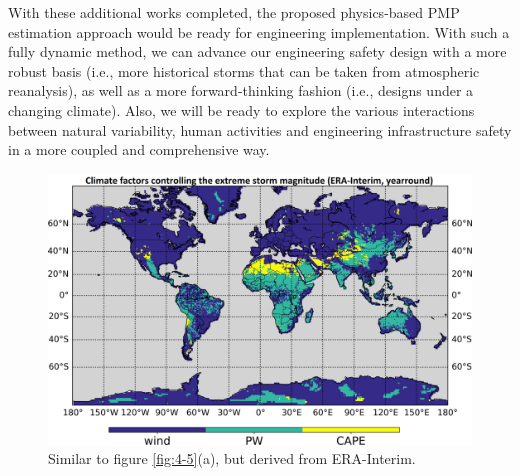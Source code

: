 With these additional works completed, the proposed physics-based PMP estimation approach would be ready for engineering implementation. With such a fully dynamic method, we can advance our engineering safety design with a more robust basis (i.e., more historical storms that can be taken from atmospheric reanalysis), as well as a more forward-thinking fashion (i.e., designs under a changing climate). Also, we will be ready to explore the various interactions between natural variability, human activities and engineering infrastructure safety in a more coupled and comprehensive way.

\begin{figure}[htbp]
	\centering
	\includegraphics[width=\linewidth]{pics/ch6/fig2.png}
	\caption{Similar to figure \ref{fig:4-5}(a), but derived from ERA-Interim.}
	\label{fig:6-2}
\end{figure}
